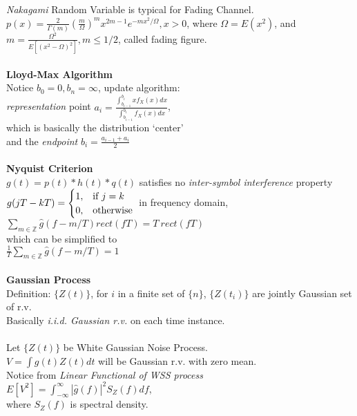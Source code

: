 \documentclass [12pt] {article}
\begin{document}
\begin{spacing}{1.5}
\begin{multicols}{2}
\emph{Nakagami} Random Variable is typical for Fading Channel.\\
$p(x) = \frac{2}{\Gamma(m)}(\frac{m}{\Omega})^m x^{2m-1}e^{-m x^2/\Omega}, x>0$, where $\Omega = E(x^2)$, and $m = \frac{\Omega^2}{E[(x^2-\Omega)^2]}, m \leq 1/2$, called fading figure. \\
~\\
\textbf{Lloyd-Max Algorithm}\\
Notice $b_0 = 0, b_n = \infty$, update algorithm: \\
\emph{representation} point $a_i = \frac{\int_{b_{i-1}}^{b_i}x f_X(x)dx}{\int_{b_{i-1}}^{b_i}f_X(x)dx}$, \\
which is basically the distribution `center'\\
and the \emph{endpoint} $b_i = \frac{a_{i-1} + a_{i}}{2}$\\
~\\
\textbf{Nyquist Criterion}\\
$g(t)=p(t)\ast h(t) \ast q(t)$ satisfies no \emph{inter-symbol interference} property\\
$ g(jT-kT)=\begin{cases}
    1, & \text{if } j=k\\
    0,              & \text{otherwise}
\end{cases}\\$
in frequency domain, \\
$ \sum_{m \in \mathbb{Z}} \hat{g}(f-m/T)rect(fT) = T \: rect(fT)$\\
which can be simplified to \\
$ \frac{1}{T} \sum_{m \in \mathbb{Z}} \hat{g}(f-m/T) = 1$\\
~\\
\textbf{Gaussian Process}\\
Definition: $\{ Z(t)\}$, for $i$ in a finite set of $\{ n \}$, $\{Z(t_i)\}$ are jointly Gaussian set of r.v.\\
Basically \emph{i.i.d. Gaussian r.v.} on each time instance.\\
~\\
Let $\{ Z(t)\}$ be White Gaussian Noise Process. \\
$V = \int g(t) Z(t) dt $ will be Gaussian r.v. with zero mean.\\
Notice from \emph{Linear Functional of WSS process}\\
$E[V^2] = \int_{-\infty}^{\infty} |\hat{g}(f)|^2 S_Z(f) df$, \\
where $S_Z(f)$ is spectral density.\\

\end{multicols}
\end{spacing}
\end{document}
